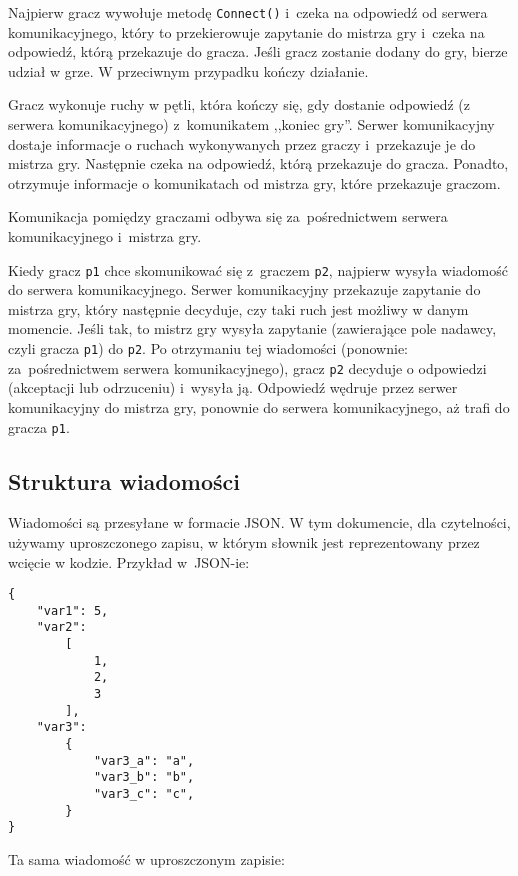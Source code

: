 \documentclass[a4paper]{article}
\newcommand{\code}{\texttt}
\begin{document}
Najpierw gracz wywołuje metodę \code{Connect()} i~czeka na odpowiedź od serwera komunikacyjnego, który to przekierowuje zapytanie do mistrza gry i~czeka na odpowiedź, którą przekazuje do gracza.
Jeśli gracz zostanie dodany do gry, bierze udział w grze.
W przeciwnym przypadku kończy działanie.



Gracz wykonuje ruchy w pętli, która kończy się, gdy dostanie odpowiedź (z serwera komunikacyjnego) z~komunikatem ,,koniec gry''.
Serwer komunikacyjny dostaje informacje o ruchach wykonywanych przez graczy i~przekazuje je do mistrza gry.
Następnie czeka na odpowiedź, którą przekazuje do gracza.
Ponadto, otrzymuje informacje o komunikatach od mistrza gry, które przekazuje graczom.



Komunikacja pomiędzy graczami odbywa się za~pośrednictwem serwera komunikacyjnego i~mistrza gry.

Kiedy gracz \code{p1} chce skomunikować się z~graczem \code{p2}, najpierw wysyła wiadomość do serwera komunikacyjnego.
Serwer komunikacyjny przekazuje zapytanie do mistrza gry, który następnie decyduje, czy taki ruch jest możliwy w danym momencie.
Jeśli tak, to mistrz gry wysyła zapytanie (zawierające pole nadawcy, czyli gracza \code{p1}) do \code{p2}.
Po otrzymaniu tej wiadomości (ponownie: za~pośrednictwem serwera komunikacyjnego), gracz \code{p2} decyduje o odpowiedzi (akceptacji lub odrzuceniu) i~wysyła ją. Odpowiedź wędruje przez serwer komunikacyjny do mistrza gry, ponownie do serwera komunikacyjnego, aż trafi do gracza \code{p1}.

\subsection{Struktura wiadomości}

Wiadomości są przesyłane w formacie JSON.
W tym dokumencie, dla czytelności, używamy uproszczonego zapisu, w którym słownik jest reprezentowany przez wcięcie w kodzie.
Przykład w~JSON-ie:

\begin{verbatim}
{
    "var1": 5,
    "var2":
        [
            1,
            2,
            3
        ],
    "var3":
        {
            "var3_a": "a",
            "var3_b": "b",
            "var3_c": "c",
        }
}
\end{verbatim}

Ta sama wiadomość w uproszczonym zapisie:
\end{document}
